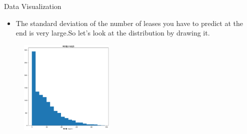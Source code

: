 \documentclass[
 size=14pt,
 paper=smartboard,  %
 mode=present, 		%
 display=slides, 	%
 style=tuliplab,  	%
 pauseslide,
 fleqn,leqno]{powerdot}
\begin{document}
\begin{slide}{Data  Visualization}
  \begin{center}

    {
      \begin{itemize}
      
        \item The standard deviation of the number of leases you have to predict at the end is very large.So let's look at the distribution by drawing it.
      \end{itemize} 
      \begin{figure}
        \centering
        \includegraphics[width=0.4\textwidth]{pic/count .eps} 
      \end{figure}
    

        
       
    }
    \end{center}
  \bigskip
    \begin{center}
    
    \end{center}
  \bigskip



\end{slide}
\end{document}
